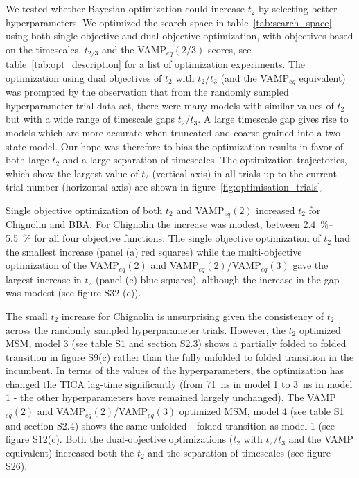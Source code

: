 \documentclass[journal=jacsat,manuscript=article]{achemso}
\begin{document}
We tested whether Bayesian optimization could increase $t_2$ by selecting better hyperparameters.  We optimized the search space in table~\ref{tab:search_space} using both single-objective and dual-objective optimization, with objectives based on the timescales, $t_{2/3}$ and the VAMP$_{eq}(2/3)$ scores, see table~\ref{tab:opt_description} for a list of optimization experiments.  The optimization using dual objectives of $t_2$ with $t_2/t_3$ (and the VAMP$_{eq}$ equivalent) was prompted by the observation that from the randomly sampled hyperparameter trial data set, there were many models with similar values of $t_2$ but with a wide range of timescale gaps $t_2/t_3$. A large timescale gap gives rise to models which are more accurate when truncated and coarse-grained into a two-state model. Our hope was therefore to bias the optimization results in favor of both large $t_2$ and a large separation of timescales. The optimization trajectories, which show the largest value of $t_2$ (vertical axis) in all trials up to the current trial number (horizontal axis) are shown in figure~\ref{fig:optimisation_trials}.  

Single objective optimization of both $t_2$ and VAMP$_{eq}(2)$ increased $t_2$ for Chignolin and BBA.  For Chignolin the increase was modest, between \SIrange[range-phrase=---]{2.4}{5.5}{\percent} for all four objective functions.  The single objective optimization of $t_2$ had the smallest increase (panel (a) red squares) while the multi-objective optimization of the VAMP$_{eq}(2)$ and VAMP$_{eq}(2)$/VAMP$_{eq}(3)$ gave the largest increase in $t_2$ (panel (c) blue squares), although the increase in the gap was modest (see figure S32 (c)). 
 
The small $t_2$ increase for Chignolin is unsurprising given the consistency of $t_2$ across the randomly sampled hyperparameter trials.  However, the $t_2$ optimized MSM, model 3 (see table S1 and section S2.3) shows a partially folded to folded transition in figure S9(c) rather than the fully unfolded to folded transition in the incumbent.  In terms of the values of the hyperparameters, the optimization has changed the TICA lag-time significantly (from \SI{71}{\nano\second} in model 1 to \SI{3}{\nano\second} in model 1 - the other hyperparameters have remained largely unchanged). The VAMP$_{eq}(2)$ and VAMP$_{eq}(2)$/VAMP$_{eq}(3)$ optimized MSM, model 4 (see table S1 and section S2.4) shows the same unfolded---folded transition as model 1 (see figure S12(c). Both the dual-objective optimizations ($t_2$ with $t_2/t_3$ and the VAMP equivalent) increased both the $t_2$ and the separation of timescales (see figure S26). 
\end{document}
